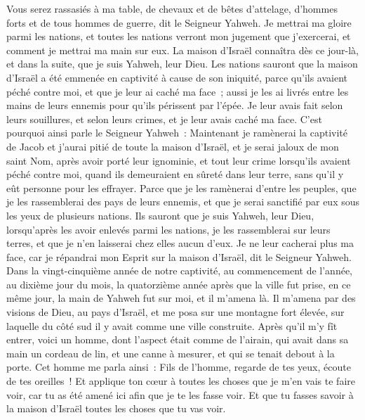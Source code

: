 \begin{multicols}{2}
Vous serez rassasiés à ma table, de chevaux et de bêtes d'attelage, d'hommes forts et de tous hommes de guerre, dit le Seigneur Yahweh.
Je mettrai ma gloire parmi les nations, et toutes les nations verront mon jugement que j'exercerai, et comment je mettrai ma main sur eux.
La maison d'Israël connaîtra dès ce jour-là, et dans la suite, que je suis Yahweh, leur Dieu.
Les nations sauront que la maison d'Israël a été emmenée en captivité à cause de son iniquité, parce qu'ils avaient péché contre moi, et que je leur ai caché ma face~; aussi je les ai livrés entre les mains de leurs ennemis pour qu'ils périssent par l'épée.
Je leur avais fait selon leurs souillures, et selon leurs crimes, et je leur avais caché ma face.
C'est pourquoi ainsi parle le Seigneur Yahweh~: Maintenant je ramènerai la captivité de Jacob et j'aurai pitié de toute la maison d'Israël, et je serai jaloux de mon saint Nom,
après avoir porté leur ignominie, et tout leur crime lorsqu'ils avaient péché contre moi, quand ils demeuraient en sûreté dans leur terre, sans qu'il y eût personne pour les effrayer.
Parce que je les ramènerai d'entre les peuples, que je les rassemblerai des pays de leurs ennemis, et que je serai sanctifié par eux sous les yeux de plusieurs nations.
Ils sauront que je suis Yahweh, leur Dieu, lorsqu'après les avoir enlevés parmi les nations, je les rassemblerai sur leurs terres, et que je n'en laisserai chez elles aucun d'eux.
Je ne leur cacherai plus ma face, car je répandrai mon Esprit sur la maison d'Israël, dit le Seigneur Yahweh.
\VerseOne{}Dans la vingt-cinquième année de notre captivité, au commencement de l'année, au dixième jour du mois, la quatorzième année après que la ville fut prise, en ce même jour, la main de Yahweh fut sur moi, et il m'amena là.
Il m'amena par des visions de Dieu, au pays d'Israël, et me posa sur une montagne fort élevée, sur laquelle du côté sud il y avait comme une ville construite.
Après qu'il m'y fît entrer, voici un homme, dont l'aspect était comme de l'airain, qui avait dans sa main un cordeau de lin, et une canne à mesurer, et qui se tenait debout à la porte.
Cet homme me parla ainsi~: Fils de l'homme, regarde de tes yeux, écoute de tes oreilles~! Et applique ton cœur à toutes les choses que je m'en vais te faire voir, car tu as été amené ici afin que je te les fasse voir. Et que tu fasses savoir à la maison d'Israël toutes les choses que tu vas voir.

\end{multicols}
